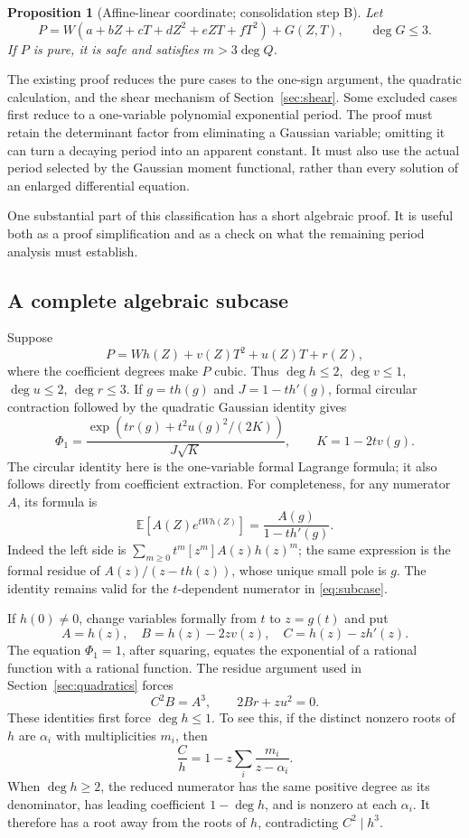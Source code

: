 \documentclass[11pt]{article}
\newtheorem{proposition}[theorem]{Proposition}
\theoremstyle{definition}\newtheorem{definition}[theorem]{Definition}
\theoremstyle{remark}\newtheorem{remark}[theorem]{Remark}
\newcommand{\E}{\mathbb E}
\begin{document}
\begin{proposition}[Affine-linear coordinate; consolidation step B]\label{prop:wlinear}
Let
\[
 P=W(a+bZ+cT+dZ^2+eZT+fT^2)+G(Z,T),\qquad\deg G\leq3.
\]
If $P$ is pure, it is safe and satisfies $m>3\deg Q$.
\end{proposition}

The existing proof reduces the pure cases to the one-sign argument,
the quadratic calculation, and the shear mechanism of
Section~\ref{sec:shear}. Some excluded cases first reduce to a
one-variable polynomial exponential period. The proof must retain
the determinant factor from eliminating a Gaussian variable; omitting
it can turn a decaying period into an apparent constant. It must also
use the actual period selected by the Gaussian moment functional,
rather than every solution of an enlarged differential equation.

One substantial part of this classification has a short algebraic proof.
It is useful both as a proof simplification and as a check on what the
remaining period analysis must establish.

\subsection{A complete algebraic subcase}\label{sec:algebraic}
Suppose
\[
 P=W h(Z)+v(Z)T^2+u(Z)T+r(Z),
\]
where the coefficient degrees make $P$ cubic. Thus
$\deg h\leq2$, $\deg v\leq1$, $\deg u\leq2$, $\deg r\leq3$.
If $g=th(g)$ and $J=1-th'(g)$, formal circular contraction followed
by the quadratic Gaussian identity gives
\begin{equation}\label{eq:subcase}
 \Phi_1=
 \frac{\exp\!\left(tr(g)+t^2u(g)^2/(2K)\right)}{J\sqrt K},
 \qquad K=1-2tv(g).
\end{equation}
The circular identity here is the one-variable formal Lagrange formula;
it also follows directly from coefficient extraction. For completeness,
for any numerator $A$, its formula is
\[
 \E[A(Z)e^{tWh(Z)}]=\frac{A(g)}{1-th'(g)}.
\]
Indeed the left side is $\sum_{m\geq0}t^m[z^m]A(z)h(z)^m$;
the same expression is the formal residue of $A(z)/(z-th(z))$,
whose unique small pole is $g$. The identity remains valid for the
$t$-dependent numerator in \eqref{eq:subcase}.

If $h(0)\ne0$, change variables formally from $t$ to $z=g(t)$ and put
\[
 A=h(z),\quad B=h(z)-2zv(z),\quad C=h(z)-zh'(z).
\]
The equation $\Phi_1=1$, after squaring, equates the exponential of a
rational function with a rational function. The residue argument used
in Section~\ref{sec:quadratics} forces
\begin{equation}\label{eq:subcaseidentities}
 C^2B=A^3,\qquad 2Br+zu^2=0.
\end{equation}
These identities first force $\deg h\leq1$. To see this, if the distinct
nonzero roots of $h$ are $\alpha_i$ with multiplicities $m_i$, then
\[
 \frac Ch=1-z\sum_i\frac{m_i}{z-\alpha_i}.
\]
When $\deg h\geq2$, the reduced numerator has the same positive degree
as its denominator, has leading coefficient $1-\deg h$, and is nonzero
at each $\alpha_i$. It therefore has a root away from the roots of $h$,
contradicting $C^2\mid h^3$.
\end{document}
